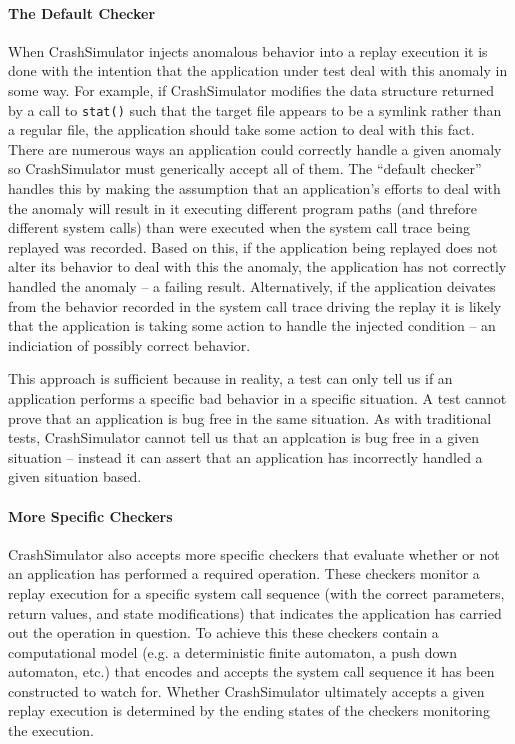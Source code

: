     
    \paragraph{The Default Checker}

    When CrashSimulator injects anomalous behavior into a replay execution it is
    done with the intention that the application under test deal with this
    anomaly in some way. For example, if CrashSimulator modifies the data
    structure returned by a call to {\tt stat()} such that the target file
    appears to be a symlink rather than a regular file, the application should
    take some action to deal with this fact.  There are numerous ways an
    application could correctly handle a given anomaly so CrashSimulator must
    generically accept all of them.  The ``default checker'' handles this by
    making the assumption that an application's efforts to deal with the anomaly
    will result in it executing different program paths (and threfore different
    system calls) than were executed when the system call trace being replayed
    was recorded.  Based on this, if the application being replayed does not
    alter its behavior to deal with this the anomaly, the application has not
    correctly handled the anomaly -- a failing result.  Alternatively, if the
    application deivates from the behavior recorded in the system call trace
    driving the replay it is likely that the application is taking some action
    to handle the injected condition -- an indiciation of possibly correct
    behavior.

    This approach is sufficient because in reality, a test can only tell us if
    an application performs a specific bad behavior in a specific situation.  A
    test cannot prove that an application is bug free in the same situation.  As
    with traditional tests, CrashSimulator cannot tell us that an applcation is
    bug free in a given situation -- instead it can assert that an application
    has incorrectly handled a given situation based.
    

    \paragraph{More Specific Checkers}

    CrashSimulator also accepts more specific checkers that evaluate whether or
    not an application has performed a required operation.  These checkers
    monitor a replay execution for a specific system call sequence (with the
    correct parameters, return values, and state modifications) that indicates
    the application has carried out the operation in question.  To achieve this
    these checkers contain a computational model (e.g. a deterministic finite
    automaton, a push down automaton, etc.) that encodes and accepts the system
    call sequence it has been constructed to watch for.  Whether CrashSimulator
    ultimately accepts a given replay execution is determined by the ending
    states of the checkers monitoring the execution.


